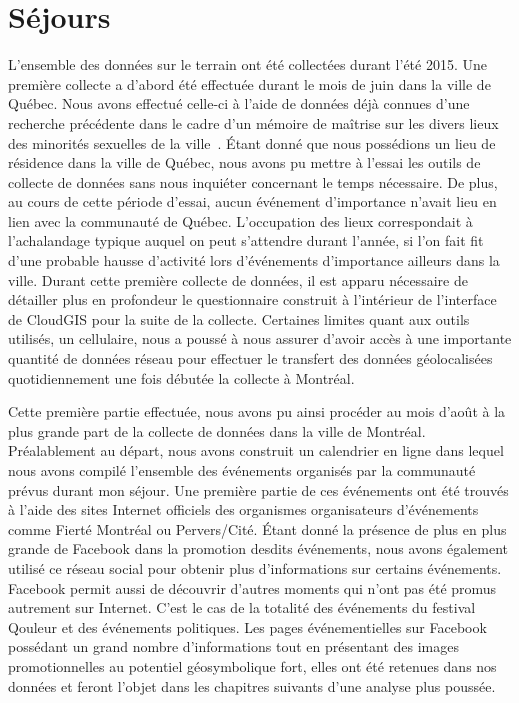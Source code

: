 \section{Séjours}
\label{sec:s_jours}
L'ensemble des données sur le terrain ont été collectées durant l'été 2015.
Une première collecte a d'abord été effectuée durant le mois de juin dans la ville de Québec.
Nous avons effectué celle-ci à l'aide de données déjà connues d'une recherche précédente dans le cadre d'un mémoire de maîtrise sur les divers lieux des minorités sexuelles de la ville~\citep{Vachon2014}.
Étant donné que nous possédions un lieu de résidence dans la ville de Québec, nous avons pu mettre à l'essai les outils de collecte de données sans nous inquiéter concernant le temps nécessaire.
De plus, au cours de cette période d'essai, aucun événement d'importance n'avait lieu en lien avec la communauté \lgbt{} de Québec.
L'occupation des lieux correspondait à l'achalandage typique auquel on peut s'attendre durant l'année, si l'on fait fit d'une probable hausse d'activité lors d'événements d'importance ailleurs dans la ville.
Durant cette première collecte de données, il est apparu nécessaire de détailler plus en profondeur le questionnaire construit à l'intérieur de l'interface de CloudGIS pour la suite de la collecte.
Certaines limites quant aux outils utilisés, un cellulaire, nous a poussé à nous assurer d'avoir accès à une importante quantité de données réseau pour effectuer le transfert des données géolocalisées quotidiennement une fois débutée la collecte à Montréal.

Cette première partie effectuée, nous avons pu ainsi procéder au mois d'août à la plus grande part de la collecte de données dans la ville de Montréal.
Préalablement au départ, nous avons construit un calendrier en ligne dans lequel nous avons compilé l'ensemble des événements organisés par la communauté \lgbt{} prévus durant mon séjour.
Une première partie de ces événements ont été trouvés à l'aide des sites Internet officiels des organismes organisateurs d'événements comme Fierté Montréal ou Pervers/Cité.
Étant donné la présence de plus en plus grande de Facebook dans la promotion desdits événements, nous avons également utilisé ce réseau social pour obtenir plus d'informations sur certains événements.
Facebook permit aussi de découvrir d'autres moments qui n'ont pas été promus autrement sur Internet.
C'est le cas de la totalité des événements du festival Qouleur et des événements politiques.
Les pages événementielles sur Facebook possédant un grand nombre d'informations tout en présentant des images promotionnelles au potentiel géosymbolique fort, elles ont été retenues dans nos données et feront l'objet dans les chapitres suivants d'une analyse plus poussée.

